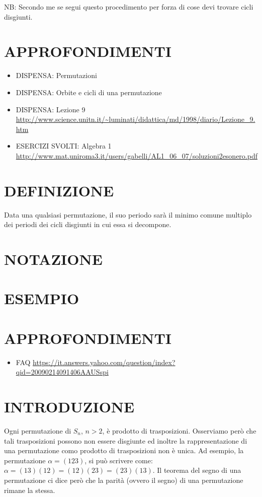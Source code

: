 NB: Secondo me se segui questo procedimento per forza di cose devi trovare cicli disgiunti.

\section{APPROFONDIMENTI}
\begin{itemize}
 \item DISPENSA: Permutazioni \cite{permutazione2}
 \item DISPENSA: Orbite e cicli di una permutazione \cite{permutazione4}
 \item DISPENSA: Lezione 9 \url{http://www.science.unitn.it/~luminati/didattica/md/1998/diario/Lezione_9.htm}
 \item ESERCIZI SVOLTI: Algebra 1 \url{http://www.mat.uniroma3.it/users/gabelli/AL1_06_07/soluzioni2esonero.pdf}
\end{itemize}



\section{DEFINIZIONE}
Data una qualsiasi permutazione, il suo periodo sarà il minimo comune multiplo dei periodi dei cicli disgiunti in cui essa si decompone. 

\section{NOTAZIONE}

\section{ESEMPIO}

\section{APPROFONDIMENTI}
\begin{itemize}
 \item FAQ \url{https://it.answers.yahoo.com/question/index?qid=20090214091406AAUSspi}
\end{itemize}




\section{INTRODUZIONE}
Ogni permutazione di $S_n$, $n>2$, è prodotto di trasposizioni. Osserviamo però che tali trasposizioni possono non essere
disgiunte ed inoltre la rappresentazione di una permutazione como prodotto di trasposizioni non è unica. Ad esempio, la permutazione
$\alpha=(123)$, si può scrivere come: $\alpha=(13)(12)=(12)(23)=(23)(13)$. Il teorema del segno di una permutazione ci dice
però che la parità (ovvero il segno) di una permutazione rimane la stessa.

